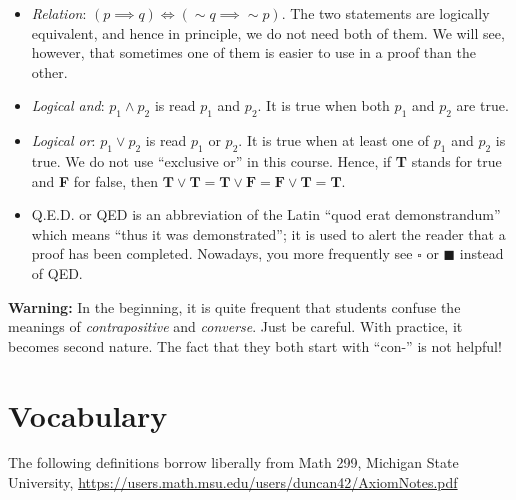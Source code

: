 \begin{itemize}
        \item[] \emph{Relation}: $(p \implies q) \Leftrightarrow (\sim q \implies \sim p)$. The two statements are logically equivalent, and hence in principle, we do not need both of them. We will see, however, that sometimes one of them is easier to use in a proof than the other. 
        \item[] \emph{Logical and}: $ p_1 \land p_2$ is read $p_1$ and $p_2$. It is true when both $p_1$ and $p_2$ are true. 
                \item[] \emph{Logical or}: $ p_1 \lor p_2$ is read $p_1$ or $p_2$. It is true when at least one of $p_1$ and $p_2$ is true. We do not use ``exclusive or'' in this course. Hence, if \textbf{T} stands for true and \textbf{F} for false, then $ \textbf{T}  \lor \textbf{T} = \textbf{T}  \lor \textbf{F} = \textbf{F}  \lor \textbf{T}  = \textbf{T} $.
        \item[] Q.E.D. or QED is an abbreviation of the Latin ``quod erat demonstrandum'' which means ``thus it was demonstrated''; it is used to alert the reader that a proof has been completed.  Nowadays, you more frequently see $\square$ or $\blacksquare$ instead of QED. 
    \end{itemize}
    
    \textbf{Warning:} In the beginning, it is quite frequent that students confuse the meanings of \emph{contrapositive} and \emph{converse}. Just be careful. With practice, it becomes second nature. The fact that they both start with ``con-'' is not helpful!

\section{Vocabulary} 
The following definitions borrow liberally from Math 299, Michigan State University, \url{https://users.math.msu.edu/users/duncan42/AxiomNotes.pdf}\\

